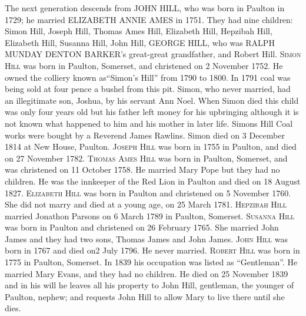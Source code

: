 The next generation descends from \uppercase{John Hill}, who was born in Paulton in 1729; he married \uppercase{Elizabeth Annie Ames} in 1751.  They had nine children: Simon Hill, Joseph Hill, Thomas Ames Hill, Elizabeth Hill, Hepzibah Hill, Elizabeth Hill, Susanna Hill, John Hill, \uppercase{ George Hill}, who was \uppercase{Ralph Munday Denton Barker}'s great-great grandfather, and Robert Hill.
\textsc{Simon Hill} was born in Paulton, Somerset,  and christened on 2 November 1752. He owned the colliery known as``Simon's Hill'' from 1790 to 1800. In 1791 coal was being sold at four pence a bushel from this pit. Simon, who never married, had an illegitimate son, Joshua, by his servant Ann Noel. When Simon died this child was only four years old but his father left money for his upbringing although it is not known what happened to him and his mother in later life. Simons Hill Coal works were bought by a Reverend James Rawlins. Simon died on 3 December 1814 at New House, Paulton.
\textsc{Joseph Hill} was born in 1755 in Paulton, and died on 27 November 1782.
\textsc{Thomas Ames Hill} was born in Paulton, Somerset, and was christened on 11 October 1758. He married Mary Pope but they had no children. He was the innkeeper of the Red Lion in Paulton and died on 18 August 1827.
\textsc{Elizabeth Hill} was born in Paulton and christened on 5 November 1760. She did not marry and died at a young age, on  25 March 1781.
\textsc{Hepzibah Hill} married Jonathon Parsons on 6 March 1789 in Paulton, Somerset.
\textsc{Susanna Hill} was born in Paulton and christened on 26 February 1765. She married John James and they had two sons, Thomas James and John James.
\textsc{John Hill} was born in 1767 and died on2 July 1796. He never married.
\textsc{Robert Hill} was born in 1775 in Paulton, Somerset. In 1839 his occupation was listed as ``Gentleman''. He married Mary Evans, and they had no children. He died on 25 November 1839 and in his will he leaves all his property to John Hill, gentleman, the younger of Paulton, nephew; and requests John Hill to allow Mary to live there until she dies.

